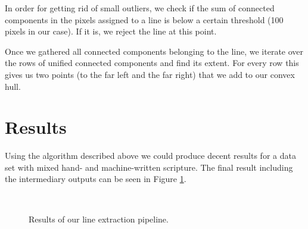 \documentclass[conference]{IEEEtran}
\begin{document}
In order for getting rid of small outliers, 
we check if the sum of connected components in the pixels assigned to a line is below a certain threshold (100 pixels in our case). 
If it is, we reject the line at this point.

Once we gathered all connected components belonging to the line, 
we iterate over the rows of unified connected components and find its
extent. 
For every row this gives us two points 
(to the far left and the far right) that we add to our convex hull.
\section{Results}
Using the algorithm described above we could produce decent results for a data set with mixed hand- and machine-written scripture. 
The final result including the intermediary outputs can be seen in Figure \ref{fig:Results}.
\begin{figure}[ht!]%
\centering
{}
\\
\caption{Results of our line extraction pipeline.}
\label{fig:Results}
\end{figure}
\end{document}
